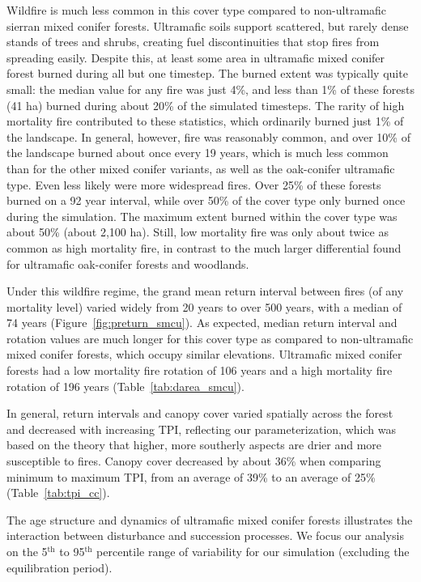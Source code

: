 Wildfire is much less common in this cover type compared to non-ultramafic sierran mixed conifer forests. Ultramafic soils support scattered, but rarely dense stands of trees and shrubs, creating fuel discontinuities that stop fires from spreading easily. Despite this, at least some area in ultramafic mixed conifer forest burned during all but one timestep. The burned extent was typically quite small: the median value for any fire was just 4\%, and less than 1\% of these forests (41 ha) burned during about 20\% of the simulated timesteps. The rarity of high mortality fire contributed to these statistics, which ordinarily burned just 1\% of the landscape. In general, however, fire was reasonably common, and over 10\% of the landscape burned about once every 19 years, which is much less common than for the other mixed conifer variants, as well as the oak-conifer ultramafic type. Even less likely were more widespread fires. Over 25\% of these forests burned on a 92 year interval, while over 50\% of the cover type only burned once during the simulation. The maximum extent burned within the cover type was about 50\% (about 2,100 ha). Still, low mortality fire was only about twice as common as high mortality fire, in contrast to the much larger differential found for ultramafic oak-conifer forests and woodlands.

Under this wildfire regime, the grand mean return interval between fires (of any mortality level) varied widely from 20 years to over 500 years, with a median of 74 years (Figure~\ref{fig:preturn_smcu}). As expected, median return interval and rotation values are much longer for this cover type as compared to non-ultramafic mixed conifer forests, which occupy similar elevations. Ultramafic mixed conifer forests had a low mortality fire rotation of 106 years and a high mortality fire rotation of 196 years (Table~\ref{tab:darea_smcu}). 

In general, return intervals and canopy cover varied spatially across the forest and decreased with increasing TPI, reflecting our parameterization, which was based on the theory that higher, more southerly aspects are drier and more susceptible to fires. Canopy cover decreased by about 36\% when comparing minimum to maximum TPI, from an average of 39\% to an average of 25\% (Table~\ref{tab:tpi_cc}). 


The age structure and dynamics of ultramafic mixed conifer forests illustrates the interaction between disturbance and succession processes. We focus our analysis on the 5$^{\text{th}}$ to 95$^{\text{th}}$ percentile range of variability for our simulation (excluding the equilibration period).

